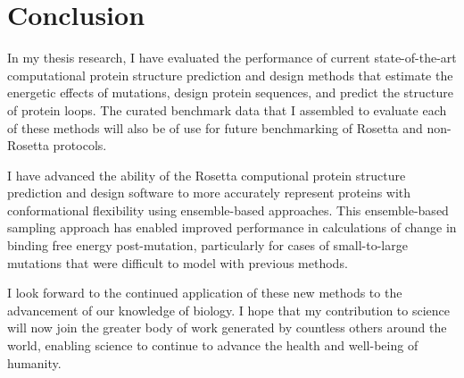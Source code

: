 \chapter{Conclusion}

In my thesis research, I have evaluated the performance of current state-of-the-art computational protein structure prediction and design methods that estimate the energetic effects of mutations, design protein sequences, and predict the structure of protein loops. The curated benchmark data that I assembled to evaluate each of these methods will also be of use for future benchmarking of Rosetta and non-Rosetta protocols.

I have advanced the ability of the Rosetta computional protein structure prediction and design software to more accurately represent proteins with conformational flexibility using ensemble-based approaches.
This ensemble-based sampling approach has enabled improved performance in calculations of change in binding free energy post-mutation, particularly for cases of small-to-large mutations that were difficult to model with previous methods.

I look forward to the continued application of these new methods to the advancement of our knowledge of biology. I hope that my contribution to science will now join the greater body of work generated by countless others around the world, enabling science to continue to advance the health and well-being of humanity.